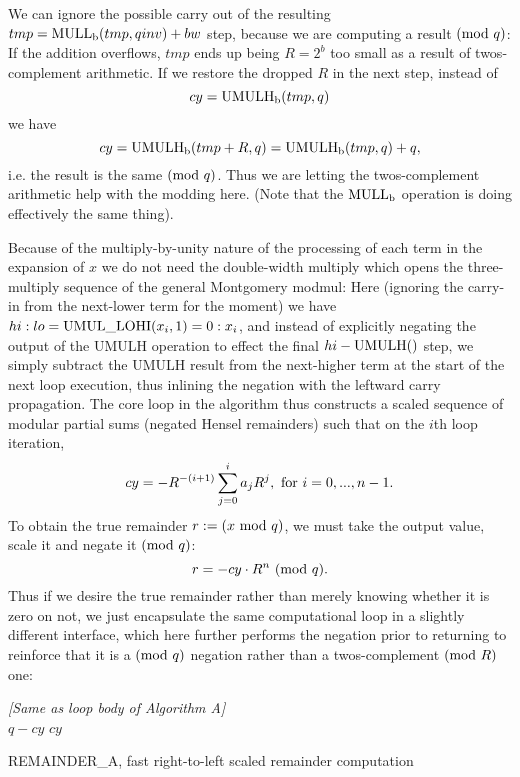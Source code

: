 \documentclass{article}
\begin{document}
We can ignore the possible carry out of the resulting $tmp = {\rm MULL_b}(tmp, qinv) + bw$ step, because we are computing a result $({\rm mod}\ q)$: If the addition overflows, $tmp$ ends up being $R = 2^b$ too small as a result of twos-complement arithmetic. If we restore the dropped $R$ in the next step, instead of
$$
cy = {\rm UMULH_b}(tmp, q)
$$
we have
$$
cy = {\rm UMULH_b}(tmp + R, q) = {\rm UMULH_b}(tmp, q) + q ,
$$
i.e. the result is the same $({\rm mod}\ q)$. Thus we are letting the twos-complement arithmetic help with the modding here. (Note that the ${\rm MULL_b}$ operation is doing effectively the same thing).

Because of the multiply-by-unity nature of the processing of each term in the expansion of $x$ we do not need the double-width multiply which opens the three-multiply sequence of the general Montgomery modmul: Here (ignoring the carry-in from the next-lower term for the moment) we have $hi:lo = {\rm UMUL\_LOHI}(x_i, 1) = 0:x_i$, and instead of explicitly negating the output of the UMULH operation to effect the final $hi - {\rm UMULH}()$ step, we simply subtract the UMULH result from the next-higher term at the start of the next loop execution, thus inlining the negation with the leftward carry propagation. The core loop in the algorithm thus constructs a scaled sequence of modular partial sums (negated Hensel remainders) such that on the $i$th loop iteration,
\begin{equation}
	cy = - R^{-(i+1)} \sum_{j=0}^{i} a_j R^j,\ {\rm for}\ i = 0, ... , n-1.
\label{Asum}
\end{equation}
To obtain the true remainder $r := (x\ {\rm mod}\ q)$, we must take the output value, scale it and negate it $({\rm mod}\ q)$:
\begin{equation}
	r = -cy \cdot R^n \ ({\rm mod}\ q).
\label{Ascale}
\end{equation}
Thus if we desire the true remainder rather than merely knowing whether it is zero on not, we just encapsulate the same computational loop in a slightly different interface, which here further performs the negation prior to returning to reinforce that it is a $({\rm mod}\ q)$ negation rather than a twos-complement $({\rm mod}\ R)$ one:
\vspace{0.1in}

\begin{algorithm}[H]
\SetAlgoLined
{}
\vspace{0.1in}
{
	{\em [Same as loop body of Algorithm A]}\\
	 {
		\Return $q - cy$\;
	}{
		\Return $cy$\;
	}
}
\caption{REMAINDER\_A, fast right-to-left scaled remainder computation}
\label{algo_ar}
\end{algorithm}
\vspace{0.1in}
\end{document}
